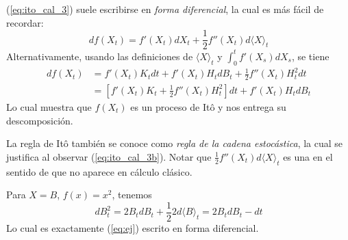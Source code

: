 \begin{remark}
        (\ref{eq:ito_cal_3}) suele escribirse en \textit{forma diferencial}, la cual es más fácil de 
        recordar: 
        \begin{equation*}
                \label{eq:ito_cal_3b}
                \tag{$\square$}
                df(X_t) = f'(X_t)dX_t + \frac{1}{2} f''(X_t)d\langle X \rangle_t
        \end{equation*}
        Alternativamente, usando las definiciones de $\langle X \rangle_t$  y $\int_{0}^{t} f'(X_s) dX_s$, 
        se tiene 
        \begin{align*}
                df(X_t) 
                &= f'(X_t) K_t dt + f'(X_t) H_t dB_t + \frac{1}{2} f''(X_t) H^2_t dt \\ 
                &= \left[ f'(X_t) K_t + \frac{1}{2} f''(X_t) H_t^2 \right] dt + f'(X_t) H_t dB_t
        \end{align*}
        Lo cual muestra que $f(X_t)$ es un proceso de It\^{o} y nos entrega su descomposición.
\end{remark}
\begin{remark}
        La regla de It\^{o} también se conoce como \textit{regla de la cadena estocástica}, la cual se 
        justifica al observar (\ref{eq:ito_cal_3b}). Notar que $\frac{1}{2}f''(X_t) d\langle X \rangle_t$ 
        es una  en el sentido de que no aparece en cálculo clásico. 
\end{remark}
\begin{example}
        Para $X = B$, $f(x) = x^2$, tenemos 
        \begin{equation*}
                dB_t^2 = 2B_t dB_t + \frac{1}{2} 2 d \langle B \rangle_t = 2B_t dB_t - dt
        \end{equation*}
        Lo cual es exactamente (\ref{eq:ej}) escrito en forma diferencial. 
\end{example}

